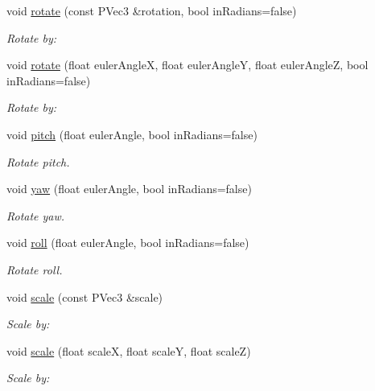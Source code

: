 \begin{DoxyCompactItemize}
void \mbox{\hyperlink{classprz_1_1_transform_aa9461cdc00cb147ae4b95d464c13e8df}{rotate}} (const P\+Vec3 \&rotation, bool in\+Radians=false)
\begin{DoxyCompactList}\small\item\em Rotate by\+: \end{DoxyCompactList}\item 
void \mbox{\hyperlink{classprz_1_1_transform_af178ca44d41e51afc3f939df25b4e3c3}{rotate}} (float euler\+AngleX, float euler\+AngleY, float euler\+AngleZ, bool in\+Radians=false)
\begin{DoxyCompactList}\small\item\em Rotate by\+: \end{DoxyCompactList}\item 
void \mbox{\hyperlink{classprz_1_1_transform_adb37c1546b894feaee1108c3fe80d52e}{pitch}} (float euler\+Angle, bool in\+Radians=false)
\begin{DoxyCompactList}\small\item\em Rotate pitch. \end{DoxyCompactList}\item 
void \mbox{\hyperlink{classprz_1_1_transform_a801b4c4effff845ec88805af04eaec0b}{yaw}} (float euler\+Angle, bool in\+Radians=false)
\begin{DoxyCompactList}\small\item\em Rotate yaw. \end{DoxyCompactList}\item 
void \mbox{\hyperlink{classprz_1_1_transform_a78540142dce967ed0233e49bc8da8d25}{roll}} (float euler\+Angle, bool in\+Radians=false)
\begin{DoxyCompactList}\small\item\em Rotate roll. \end{DoxyCompactList}\item 
void \mbox{\hyperlink{classprz_1_1_transform_aea8bf8742f7ccfd83582891c1d30076f}{scale}} (const P\+Vec3 \&scale)
\begin{DoxyCompactList}\small\item\em Scale by\+: \end{DoxyCompactList}\item 
void \mbox{\hyperlink{classprz_1_1_transform_acccc4fbdffb85695a45742d44c03f456}{scale}} (float scaleX, float scaleY, float scaleZ)
\begin{DoxyCompactList}\small\item\em Scale by\+: \end{DoxyCompactList}\item 

\end{DoxyCompactItemize}
